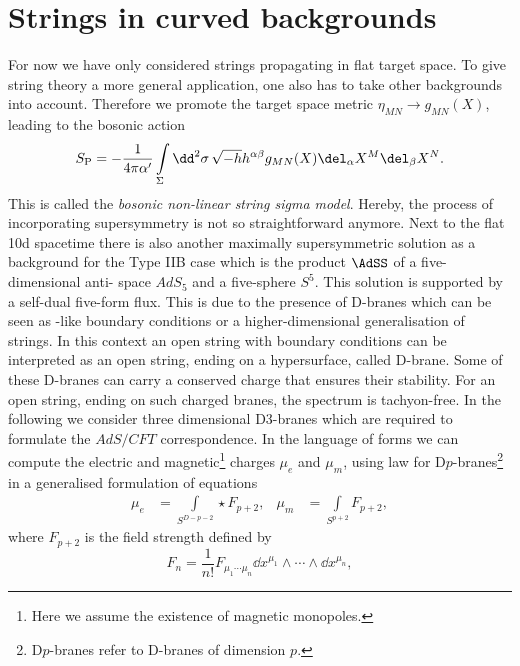 \section{Strings in curved backgrounds}
For now we have only considered strings propagating in flat  target space. To give string theory a more general application, one also has to take other backgrounds into account. Therefore we promote the target space metric $\eta_{MN}\rightarrow g_{MN}(X)$, leading to the bosonic  action
%
%
\begin{equation}
S_{\rm P} = -\frac{1}{4\pi\alpha'}  \int\limits_{\Sigma} \dd^{2}\sigma\, \sqrt{-h}h^{\alpha\beta}g_{MN}(X) \del_{\alpha}X^{M}\del_{\beta}X^{N}.
\label{eq: S_P_nlsigma}
\end{equation}
%
%
This is called the \textit{bosonic non-linear string sigma model}. Hereby, the process of incorporating supersymmetry is not so straightforward anymore. Next to the flat 10d  spacetime there is also another maximally supersymmetric solution as a background for the Type IIB case which is the product $\AdSS$ of a five-dimensional anti- space $AdS_{5}$ and a five-sphere $S^{5}$. This solution is supported by a self-dual  five-form flux. This is due to the presence of D-branes which can be seen as -like boundary conditions or a higher-dimensional generalisation of strings. In this context an open string with  boundary conditions can be interpreted as an open string, ending on a hypersurface, called D-brane. Some of these D-branes can carry a conserved charge that ensures their stability. For an open string, ending on such charged branes, the spectrum is tachyon-free. In the following we consider three dimensional D3-branes which are required to formulate the $AdS/CFT$ correspondence. In the language of forms we can compute the electric and magnetic\footnote{Here we assume the existence of magnetic monopoles.} charges $\mu_{e}$ and $\mu_{m}$, using  law for D$p$-branes\footnote{D$p$-branes refer to D-branes of dimension $p$.} in a generalised formulation of  equations
%
%
\begin{align}
\mu_{e} &= \int\limits_{S^{D-p-2}} \star F_{p+2},  &   \mu_{m} &= \int\limits_{S^{p+2}}  F_{p+2},
\end{align}
%
%
where $F_{p+2}$ is the field strength defined by
%
%
\begin{equation}
F_{n} = \frac{1}{n!} F_{\mu_{1}\cdots \mu_{n}} \dd x^{\mu_{1}} \wedge \cdots \wedge \dd x^{\mu_{n}},
\end{equation}
